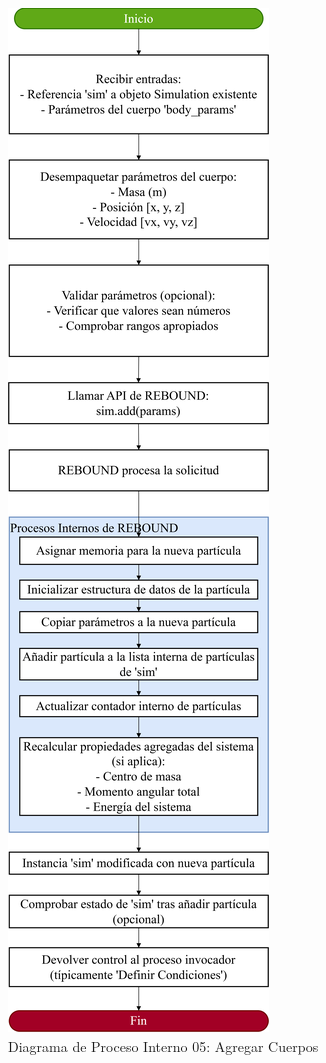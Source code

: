 \begin{figure}[H]
    \centering
    \includegraphics[width=\textwidth]{img/Analisis/DiagramaProcesos/DiagramaProceso05AgregarCuerpos.png}
    \caption{Diagrama de Proceso Interno 05: Agregar Cuerpos}%
    \label{fig:process_diagram05}
\end{figure}

